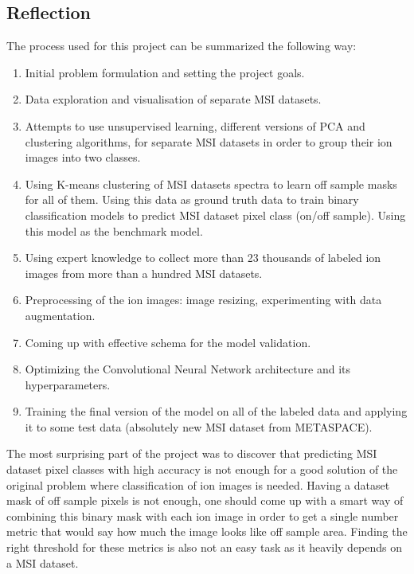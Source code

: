 \documentclass[a4paper]{article}
\begin{document}
    \subsection*{Reflection}
    
    The process used for this project can be summarized the following way:
    
    \begin{enumerate}
        \item Initial problem formulation and setting the project goals.
        \item Data exploration and visualisation of separate MSI datasets.
        \item Attempts to use unsupervised learning, different versions of PCA and clustering algorithms,
        for separate MSI datasets in order to group their ion images into two classes.
        \item Using K-means clustering of MSI datasets spectra to learn off sample masks for all of them. Using this data as 
        ground truth data to train binary classification models to predict MSI dataset pixel class (on/off sample).
        Using this model as the benchmark model.
        \item Using expert knowledge to collect more than 23 thousands of labeled ion images from more than a hundred MSI datasets.
        \item Preprocessing of the ion images: image resizing, experimenting with data augmentation.
        \item Coming up with effective schema for the model validation.
        \item Optimizing the Convolutional Neural Network architecture and its hyperparameters.
        \item Training the final version of the model on all of the labeled data and applying it to some test data
        (absolutely new MSI dataset from METASPACE).
    \end{enumerate}
    
    The most surprising part of the project was to discover that predicting MSI dataset pixel classes with high accuracy
    is not enough for a good solution of the original problem where classification of ion images is needed.
    Having a dataset mask of off sample pixels is not enough, one should come up with a smart way 
    of combining this binary mask with each ion image in order to get a single number metric that
    would say how much the image looks like off sample area.
    Finding the right threshold for these metrics is also not an easy task as it heavily depends on a MSI dataset.
    
\end{document}
